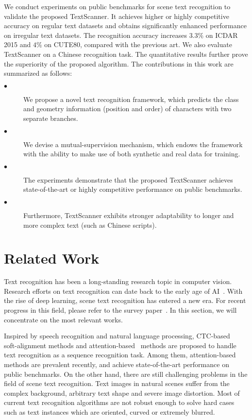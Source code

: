 \documentclass[letterpaper]{article} \usepackage{aaai20}  \usepackage{times}  \usepackage{helvet} \usepackage{courier}  \usepackage[hyphens]{url}  \usepackage{graphicx} \urlstyle{rm} \def\UrlFont{\rm}  \usepackage{graphicx}  \frenchspacing  \setlength{\pdfpagewidth}{8.5in}  \setlength{\pdfpageheight}{11in}
\begin{document}
We conduct experiments on public benchmarks for scene text recognition to validate the proposed TextScanner. It achieves higher or highly competitive accuracy on regular text datasets and obtains significantly enhanced performance on irregular text datasets. The recognition accuracy increases $3.3\%$ on ICDAR 2015 and $4\%$ on CUTE80, compared with the previous art. We also evaluate TextScanner on a Chinese recognition task. The quantitative results further prove the superiority of the proposed algorithm. The contributions in this work are summarized as follows:
\begin{description}
\item[$\bullet$] We propose a novel text recognition framework, which predicts the class and geometry information (position and order) of characters with two separate branches.
\item[$\bullet$] We devise a mutual-supervision mechanism, which endows the framework with the ability to make use of both synthetic and real data for training.
\item[$\bullet$] The experiments demonstrate that the proposed TextScanner achieves state-of-the-art or highly competitive performance on public benchmarks.
\item[$\bullet$] Furthermore, TextScanner exhibits stronger adaptability to longer and more complex text (such as Chinese scripts).
\end{description}


\section{Related Work}

Text recognition has been a long-standing research topic in computer vision. Research efforts on text recognition can date back to the early age of AI~\cite{herbert1982history,lecun1998gradient}. With the rise of deep learning, scene text recognition has entered a new era. For recent progress in this field, please refer to the survey paper~\cite{long2018scene,zhu2016scene}. In this section, we will concentrate on the most relevant works.

Inspired by speech recognition and natural language processing, CTC-based~\cite{shi2017end,ctc} soft-alignment methods and attention-based~\cite{visual_attn,aster} methods are proposed to handle text recognition as a sequence recognition task. Among them, attention-based methods are prevalent recently, and achieve state-of-the-art performance on public benchmarks. On the other hand, there are still challenging problems in the field of scene text recognition. Text images in natural scenes suffer from the complex background, arbitrary text shape and severe image distortion. Most of current text recognition algorithms are not robust enough to solve hard cases such as text instances which are oriented, curved or extremely blurred.
\end{document}

